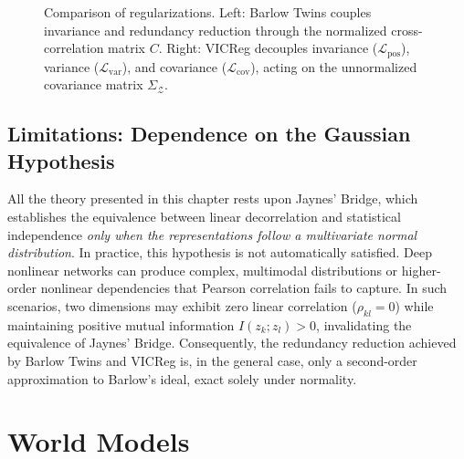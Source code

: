 \documentclass[11pt, oneside, openany]{book}
\begin{document}
\begin{figure}[H]
{
}
\caption{Comparison of regularizations. Left: Barlow Twins couples invariance and redundancy reduction through the normalized cross-correlation matrix $C$. Right: VICReg decouples invariance ($\mathcal{L}_{\text{pos}}$), variance ($\mathcal{L}_{\text{var}}$), and covariance ($\mathcal{L}_{\text{cov}}$), acting on the unnormalized covariance matrix $\Sigma_\mathcal{Z}$.}
\label{fig:5.4}
\end{figure}

\section{Limitations: Dependence on the Gaussian Hypothesis}
\label{sec:5.4}

All the theory presented in this chapter rests upon Jaynes' Bridge, which establishes the equivalence between linear decorrelation and statistical independence \textit{only when the representations follow a multivariate normal distribution}. In practice, this hypothesis is not automatically satisfied. Deep nonlinear networks can produce complex, multimodal distributions or higher-order nonlinear dependencies that Pearson correlation fails to capture. In such scenarios, two dimensions may exhibit zero linear correlation ($\rho_{kl} = 0$) while maintaining positive mutual information $I(z_{k}; z_{l}) > 0$, invalidating the equivalence of Jaynes' Bridge. Consequently, the redundancy reduction achieved by Barlow Twins and VICReg is, in the general case, only a second-order approximation to Barlow's ideal, exact solely under normality.

\chapter{World Models}
\label{chap:6}
\end{document}
